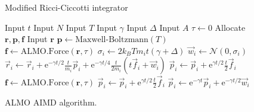 \documentclass[aip,jcp,reprint,amsmath,amssymb]{revtex4-1}
\begin{document}
\begin{figure}
\begin{algorithm}[H]
  \caption{Modified Ricci-Ciccotti integrator}
  \label{alg:ricci}
   \begin{algorithmic}[1]
   	\State Input $t$ 
   	\State Input $N$ 
   	\State Input $T$ 
   	\State Input $\gamma$ 
   	\State Input $\Delta$  \label{line:delta1}
   	\State Input $A$ 
	\State $\tau\gets 0$ 
	\State Allocate $\mathbf{r}, \mathbf{p}, \mathbf{f}$ 
   	\State Input $\mathbf{r}$
	\State $\mathbf{p} \gets \text{Maxwell-Boltzmann}(T)$ 
	\State $\mathbf{f} \gets \text{ALMO.Force}(\mathbf{r},\tau)$ 
	 
		 
			\State $\sigma_i \gets 2 k_B T m_i t (\gamma + \Delta)$  \label{line:delta2}
			\State $\vec{w}_{i} \gets \mathcal{N}(0,\sigma_i)$ 
			\State $\vec{r}_i \gets \vec{r}_i + \mathrm{e}^{-\gamma t/2} \frac{t}{m_i}\vec{p}_i + \mathrm{e}^{-\gamma t/4} \frac{t}{2 m_i} \left( t \vec{f}_i + \vec{w}_i \right) $
			\State $\vec{p}_i \gets \vec{p}_i + \mathrm{e}^{\gamma t/2} \frac{t}{2} \vec{f}_i$ 
		\EndFor
		\State $\mathbf{f} \gets \text{ALMO.Force}(\mathbf{r},\tau)$ 
			\State $\vec{p}_i \gets \vec{p}_i + \mathrm{e}^{\gamma t/2} \frac{t}{2} \vec{f}_i $
			\State $\vec{p}_i \gets \mathrm{e}^{-\gamma t} \vec{p}_i + \mathrm{e}^{-\gamma t/2} \vec{w}_i $   
		\EndFor
	\EndFor
   \end{algorithmic}
\end{algorithm}
\caption{\label{fig:ricci} ALMO AIMD algorithm.}
\end{figure}
\end{document}

